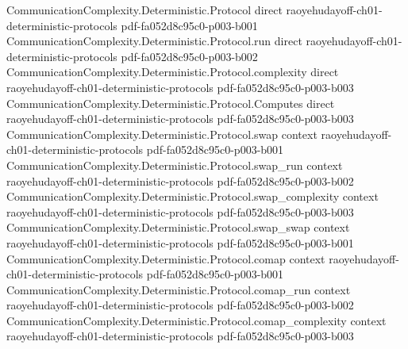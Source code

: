 \begin{theorem}
\label{CommunicationComplexity.Deterministic.le_communicationComplexity_of_forall_lt_ncard}
\leanok
{}
\proofstep
  {CommunicationComplexity.Deterministic.Protocol}
  {direct}
  {raoyehudayoff-ch01-deterministic-protocols}
  {pdf-fa052d8c95c0-p003-b001}
\proofstep
  {CommunicationComplexity.Deterministic.Protocol.run}
  {direct}
  {raoyehudayoff-ch01-deterministic-protocols}
  {pdf-fa052d8c95c0-p003-b002}
\proofstep
  {CommunicationComplexity.Deterministic.Protocol.complexity}
  {direct}
  {raoyehudayoff-ch01-deterministic-protocols}
  {pdf-fa052d8c95c0-p003-b003}
\proofstep
  {CommunicationComplexity.Deterministic.Protocol.Computes}
  {direct}
  {raoyehudayoff-ch01-deterministic-protocols}
  {pdf-fa052d8c95c0-p003-b003}
\proofstep
  {CommunicationComplexity.Deterministic.Protocol.swap}
  {context}
  {raoyehudayoff-ch01-deterministic-protocols}
  {pdf-fa052d8c95c0-p003-b001}
\proofstep
  {CommunicationComplexity.Deterministic.Protocol.swap_run}
  {context}
  {raoyehudayoff-ch01-deterministic-protocols}
  {pdf-fa052d8c95c0-p003-b002}
\proofstep
  {CommunicationComplexity.Deterministic.Protocol.swap_complexity}
  {context}
  {raoyehudayoff-ch01-deterministic-protocols}
  {pdf-fa052d8c95c0-p003-b003}
\proofstep
  {CommunicationComplexity.Deterministic.Protocol.swap_swap}
  {context}
  {raoyehudayoff-ch01-deterministic-protocols}
  {pdf-fa052d8c95c0-p003-b001}
\proofstep
  {CommunicationComplexity.Deterministic.Protocol.comap}
  {context}
  {raoyehudayoff-ch01-deterministic-protocols}
  {pdf-fa052d8c95c0-p003-b001}
\proofstep
  {CommunicationComplexity.Deterministic.Protocol.comap_run}
  {context}
  {raoyehudayoff-ch01-deterministic-protocols}
  {pdf-fa052d8c95c0-p003-b002}
\proofstep
  {CommunicationComplexity.Deterministic.Protocol.comap_complexity}
  {context}
  {raoyehudayoff-ch01-deterministic-protocols}
  {pdf-fa052d8c95c0-p003-b003}
\proofstep

\end{theorem}
